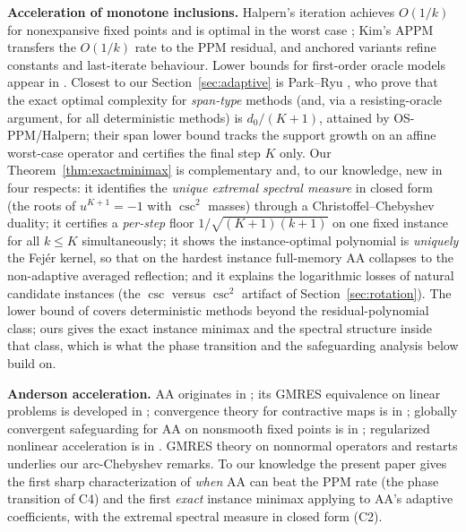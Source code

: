 \documentclass[11pt]{article}
\theoremstyle{definition}
\theoremstyle{remark}
\begin{document}
\textbf{Acceleration of monotone inclusions.} Halpern's iteration
\cite{halpern1967fixed,wittmann1992approximation} achieves $O(1/k)$ for
nonexpansive fixed points and is optimal in the worst case
\cite{lieder2021convergence,diakonikolas2020halpern}; Kim's APPM
\cite{kim2021accelerated} transfers the $O(1/k)$ rate to the PPM residual,
and anchored variants \cite{yoon2021accelerated,lee2021fast,
tran2021halpern} refine constants and last-iterate behaviour. Lower bounds
for first-order oracle models appear in
\cite{nemirovski2004prox,ouyang2021lower}. Closest to our
Section~\ref{sec:adaptive} is Park--Ryu \cite{park2022exact}, who prove
that the exact optimal complexity for \emph{span-type} methods (and, via a
resisting-oracle argument, for all deterministic methods) is
$d_0/(K+1)$, attained by OS-PPM/Halpern; their span lower bound tracks the
support growth on an affine worst-case operator and certifies the final
step $K$ only. Our Theorem~\ref{thm:exactminimax} is complementary and,
to our knowledge, new in four respects: it identifies the \emph{unique
extremal spectral measure} in closed form (the roots of $u^{K+1}=-1$ with
$\csc^2$ masses) through a Christoffel--Chebyshev duality; it certifies a
\emph{per-step} floor $1/\sqrt{(K+1)(k+1)}$ on one fixed instance for all
$k\le K$ simultaneously; it shows the instance-optimal polynomial is
\emph{uniquely} the Fej\'er kernel, so that on the hardest instance
full-memory AA collapses to the non-adaptive averaged reflection; and it
explains the logarithmic losses of natural candidate instances (the
$\csc$ versus $\csc^2$ artifact of Section~\ref{sec:rotation}). The lower
bound of \cite{park2022exact} covers deterministic methods beyond the
residual-polynomial class; ours gives the exact instance minimax and the
spectral structure inside that class, which is what the phase transition
and the safeguarding analysis below build on.

\textbf{Anderson acceleration.} AA originates in
\cite{anderson1965iterative}; its GMRES equivalence on linear problems is
developed in \cite{walker2011anderson,evans2020proof}; convergence theory
for contractive maps is in \cite{toth2015convergence,pollock2021anderson};
globally convergent safeguarding for AA on nonsmooth fixed points is in
\cite{zhang2020globally}; regularized nonlinear acceleration is in
\cite{scieur2020regularized}. GMRES theory on nonnormal operators and
restarts \cite{saad1986gmres,joubert1994convergence,
eiermann1992hybrid} underlies our arc-Chebyshev remarks. To our knowledge
the present paper gives the first sharp characterization of \emph{when} AA
can beat the PPM rate (the phase transition of C4) and the first
\emph{exact} instance minimax applying to AA's adaptive coefficients, with
the extremal spectral measure in closed form (C2).
\end{document}
